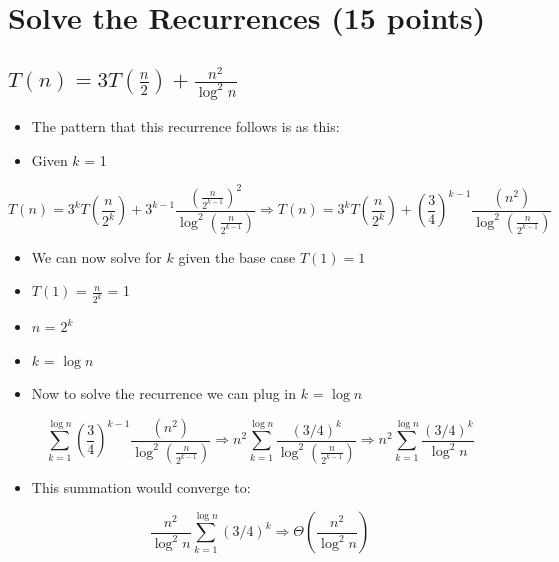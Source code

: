 \documentclass{article}[12pt]
\begin{document}
\newpage
\section{Solve the Recurrences (15 points)}

\subsection{$T(n) = 3T\left(\frac{n}{2}\right) + \frac{n^2}{\log^2 n}$}

\begin{itemize}
  \item The pattern that this recurrence follows is as this:
  \item Given $k$ = 1
\end{itemize}

\begin{equation*}
  T(n) = 3^{k} T\left(\frac{n}{2^{k}}\right) + 3^{k-1} \frac{(\frac{n}{2^{k-1}})^{2}}{\log^2 (\frac{n}{2^{k-1}})}
  \Rightarrow
  T(n) = 3^{k} T\left(\frac{n}{2^{k}}\right) + (\frac{3}{4})^{k-1} \frac{(n^{2})}{\log^2 (\frac{n}{2^{k-1}})}
\end{equation*}

\begin{itemize}
  \item We can now solve for $k$ given the base case $T(1) = 1$
  \item $T(1)$ = $\frac{n}{2^{k}}$ = 1
  \item $n$ = $2^{k}$
  \item $k$ = $\log n$
  \item Now to solve the recurrence we can plug in $k$ = $\log n$
\end{itemize}

\begin{equation*}
  \sum_{k=1}^{\log n} (\frac{3}{4})^{k-1} \frac{(n^{2})}{\log^2 (\frac{n}{2^{k-1}})}
  \Rightarrow
  n^{2} \sum_{k=1}^{\log n} \frac{(3/4)^{k}}{\log^2 (\frac{n}{2^{k-1}})}
  \Rightarrow
  n^{2} \sum_{k=1}^{\log n} \frac{(3/4)^{k}}{\log^2 n}
\end{equation*}

\begin{itemize}
  \item This summation would converge to:
\end{itemize}

\begin{equation*}
  \frac{n^2}{\log^2 n} \sum_{k=1}^{\log n} (3/4)^{k}
  \Rightarrow
  \Theta(\frac{n^2}{\log^2 n})
\end{equation*}
\end{document}
